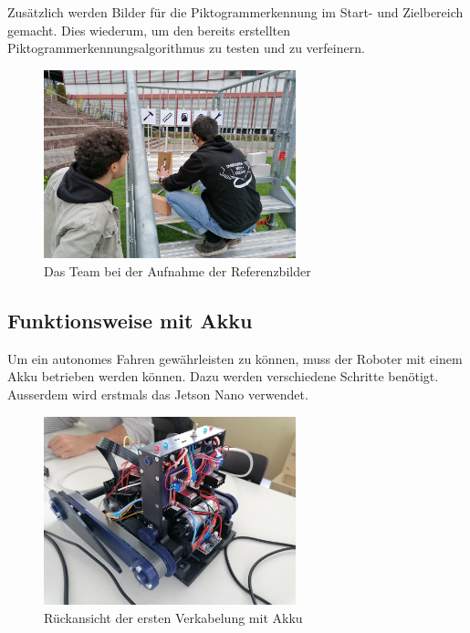   Zusätzlich werden Bilder für die Piktogrammerkennung im Start- und Zielbereich gemacht. Dies wiederum, um den bereits erstellten Piktogrammerkennungsalgorithmus zu testen und zu verfeinern.
  
  
  \begin{figure}[H]
  \includegraphics[width=0.65\textwidth]{img/Sprint3/Sprint3_Bildersammlung2.jpeg}
  \centering
  \caption{Das Team bei der Aufnahme der Referenzbilder}
  \label{fig:Aufnahmeprozess der Referenzbilder}
  \end{figure}
  
  
\subsection{Funktionsweise mit Akku}\label{sec:Funktionsweisemit Akku}

Um ein autonomes Fahren gewährleisten zu können, muss der Roboter mit einem Akku betrieben werden können. Dazu werden verschiedene Schritte benötigt. Ausserdem wird erstmals das Jetson Nano verwendet.

 \begin{figure}[H]
  \includegraphics[width=0.65\textwidth]{img/Sprint3/Sprint3_Verkabelung1.jpg}
  \centering
  \caption{Rückansicht der ersten Verkabelung mit Akku}
  \label{fig:Rückansicht der ersten Verkabelung}
  \end{figure}
  
